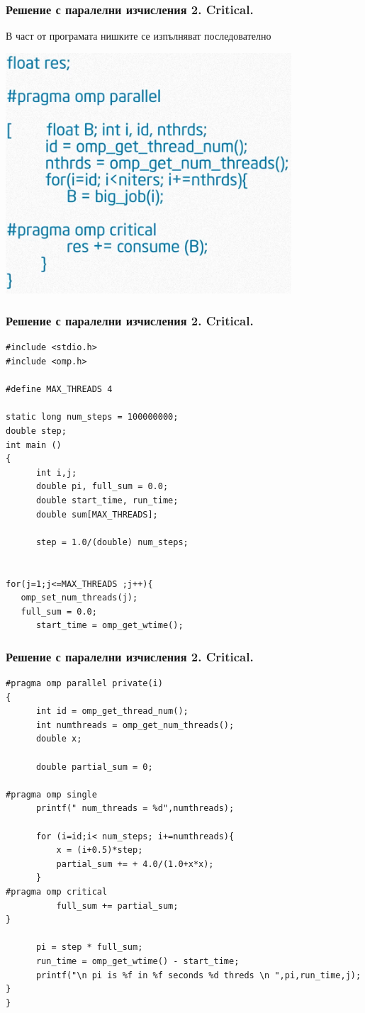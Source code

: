 \documentclass{beamer}
\begin{document}
\begin{frame}
  \frametitle{Решение с паралелни изчисления 2. Critical.}
  В част от програмата нишките се изпълняват последователно

  \includegraphics[width=0.8\textwidth]{critical}
\end{frame}

\begin{frame}
  \frametitle{Решение с паралелни изчисления 2. Critical.}
\scriptsize
\lstset{language=C++}
\begin{lstlisting}
#include <stdio.h>
#include <omp.h>

#define MAX_THREADS 4

static long num_steps = 100000000;
double step;
int main ()
{
	  int i,j;
	  double pi, full_sum = 0.0;
	  double start_time, run_time;
	  double sum[MAX_THREADS];

	  step = 1.0/(double) num_steps;


for(j=1;j<=MAX_THREADS ;j++){
   omp_set_num_threads(j);
   full_sum = 0.0;
	  start_time = omp_get_wtime();
\end{lstlisting}  
\end{frame}

\begin{frame}
  \frametitle{Решение с паралелни изчисления 2. Critical.}
\scriptsize
\lstset{language=C++}
\begin{lstlisting}
#pragma omp parallel private(i)
{
	  int id = omp_get_thread_num();
	  int numthreads = omp_get_num_threads();
	  double x;

	  double partial_sum = 0;

#pragma omp single
	  printf(" num_threads = %d",numthreads);

	  for (i=id;i< num_steps; i+=numthreads){
		  x = (i+0.5)*step;
		  partial_sum += + 4.0/(1.0+x*x);
	  }
#pragma omp critical
		  full_sum += partial_sum;
}
      
	  pi = step * full_sum;
	  run_time = omp_get_wtime() - start_time;
	  printf("\n pi is %f in %f seconds %d threds \n ",pi,run_time,j);
}
}	  
\end{lstlisting}  
\end{frame}
\end{document}
